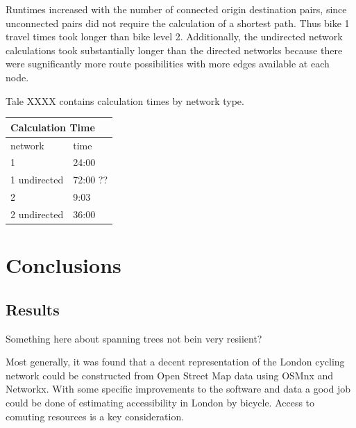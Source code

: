 \documentclass[11pt]{article} %
\begin{document}
Runtimes increased with the number of connected origin destination pairs, since unconnected pairs  did not require the calculation of a shortest path. Thus bike 1 travel times took longer than bike level 2. Additionally, the undirected network calculations took substantially longer than the directed networks because there were sugnificantly more route possibilities with more edges available at each node. 

Tale XXXX contains calculation times by network type. 

\begin{table}[]
\begin{tabular}{ll}
\multicolumn{2}{l}{Calculation Time} \\ \hline
network             & time           \\
1                   & 24:00          \\
1 undirected        & 72:00 ??       \\
2                   & 9:03           \\
2 undirected        & 36:00         
\end{tabular}
\end{table}



\section{Conclusions}


\subsection{Results}


Something here about spanning trees not bein very resiient? 

Most generally, it was found that a decent representation of the London cycling network could be constructed from Open Street Map data using OSMnx and Networkx. With some specific improvements to the software and data a good job could be done of estimating accessibility in London by bicycle. Access to comuting resources is a key consideration. 
\end{document}
